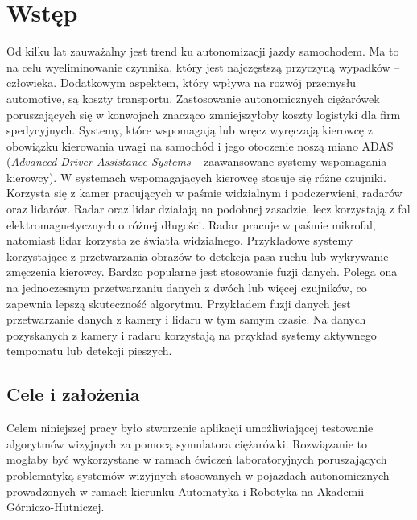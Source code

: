 \chapter{Wstęp}


Od kilku lat zauważalny jest trend ku autonomizacji jazdy samochodem.  
Ma to na celu wyeliminowanie czynnika, który jest najczęstszą przyczyną wypadków -- człowieka. Dodatkowym aspektem, który wpływa na rozwój przemysłu automotive, są koszty transportu. Zastosowanie autonomicznych ciężarówek poruszających się w konwojach znacząco zmniejszyłoby koszty logistyki dla firm spedycyjnych. %
Systemy, które wspomagają lub wręcz wyręczają kierowcę z obowiązku kierowania uwagi na samochód i jego otoczenie noszą miano ADAS (\textit{Advanced Driver Assistance Systems} -- zaawansowane systemy wspomagania kierowcy). 
W systemach wspomagających kierowcę stosuje się różne czujniki. Korzysta się z kamer pracujących w paśmie widzialnym i podczerwieni, radarów oraz lidarów. Radar oraz lidar działają na podobnej zasadzie, lecz korzystają z fal elektromagnetycznych o różnej długości.
Radar pracuje w paśmie mikrofal, natomiast lidar korzysta ze światła widzialnego.
Przykładowe systemy korzystające z przetwarzania obrazów to detekcja pasa ruchu lub wykrywanie zmęczenia kierowcy. 
Bardzo popularne jest stosowanie fuzji danych. 
Polega ona na jednoczesnym przetwarzaniu danych z dwóch lub więcej czujników, co zapewnia lepszą skuteczność algorytmu. Przykładem fuzji danych jest przetwarzanie danych z kamery i lidaru w tym samym czasie. %
Na danych pozyskanych z kamery i radaru korzystają na przykład systemy aktywnego tempomatu lub detekcji pieszych.


\section{Cele i założenia}

Celem niniejszej pracy było stworzenie aplikacji umożliwiającej testowanie algorytmów wizyjnych za pomocą symulatora ciężarówki.
Rozwiązanie to mogłaby być wykorzystane w ramach ćwiczeń laboratoryjnych poruszających problematyką systemów wizyjnych stosowanych w pojazdach autonomicznych prowadzonych w ramach kierunku Automatyka i Robotyka na Akademii Górniczo-Hutniczej.

